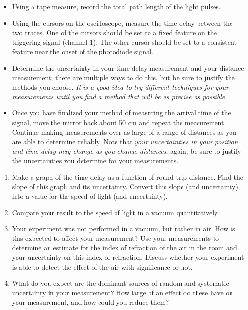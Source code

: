 \documentclass[11pt]{article}
\begin{document}
\vspace{5mm}


\begin{itemize}
\item Using a tape measure, record the total path length of the light pulses.

\item Using the cursors on the oscilloscope, measure the time delay between the
two traces. One of the cursors should be set to a fixed feature on the triggering
signal (channel 1).
The other cursor should be set to a consistent feature near the onset of the 
photodiode signal. 

\item Determine the uncertainty in your time delay measurement and your distance measurement; there are multiple ways to do this, but be sure to justify the methods you 
choose. \textit{It is a good idea to try different techniques for your measurements until 
you find a method that will be as precise as possible}.

\item Once you have finalized your method of measuring the arrival time of the signal, move the mirror back about 50 cm and repeat the measurement. Continue making measurements over as large of a range of distances as you are able to determine reliably. Note that \textit{your uncertainties in your position and time delay may change as you change distances}; again, be sure to justify the uncertainties you determine for your measurements.
\end{itemize}


\vspace{5mm}


\begin{enumerate}
\item Make a graph of the time delay as a function of round trip distance. Find the
slope of this graph and its uncertainty. Convert this slope (and uncertainty)
into a value for the speed of light (and uncertainty).
\item Compare your result to the speed of light in a vacuum quantitatively.
\item Your experiment was not performed in a vacuum, but rather in air. How is this 
expected to affect your measurement? Use your measurements to determine an estimate for 
the index of refraction of the air in the room and your uncertainty on this index of refraction. Discuss
whether your experiment is able to detect the effect of the air with significance 
or not.
\item What do you expect are the dominant sources of random and systematic uncertainty in 
your measurement? How large of an effect do these have on your measurement, and how could 
you reduce them?
\end{enumerate}

% 



\end{document}
